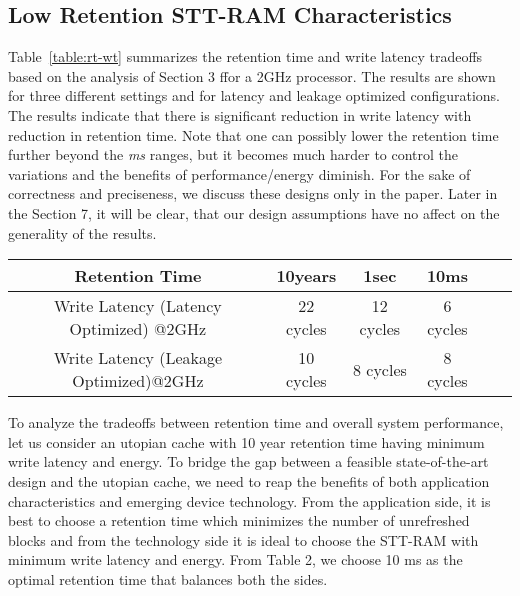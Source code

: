 \subsection{Low Retention STT-RAM Characteristics}
Table~\ref{table:rt-wt} summarizes the retention time and write latency tradeoffs based on the analysis of Section 3
ffor a 2GHz processor.
The results are shown for three different settings and for latency and leakage optimized configurations.
The results indicate that there is significant reduction in write latency with reduction in retention time.
Note that one can possibly lower the retention time further beyond the {\it ms} ranges, but it becomes much harder to control the variations and the benefits of performance/energy diminish. For the sake of correctness and preciseness,
we discuss these designs only in the paper.
Later in the Section 7, it will be clear, that our design assumptions have no affect on the generality of the results.

\begin{table*}[t]
  \centering
  \caption{Retention and Write Latencies for STT-RAM L2 Cache}
  \label{table:rt-wt}
  \begin{tabular}{| c | c | c | c | c | c |}
  	\hline
	 Retention Time & 10years & 1sec &10ms \\
	\hline
	Write Latency (Latency Optimized) @2GHz & 22 cycles & 12 cycles & 6 cycles \\
	\hline
	Write Latency (Leakage Optimized)@2GHz & 10 cycles & 8 cycles & 8 cycles \\
	\hline
  \end{tabular}
\end{table*}

To analyze the tradeoffs between retention time and overall system performance, let us consider an utopian cache
with 10 year retention time having minimum write latency and energy.  To bridge the gap between a
feasible state-of-the-art design and the utopian cache, we need to reap the benefits of both application
characteristics and emerging device technology. From the application side, it is best to choose a retention time
which minimizes the number of unrefreshed blocks and from the technology side it is ideal to choose the
STT-RAM with minimum write latency and energy. From Table 2, we choose 10 ms as the optimal retention time that
balances both the sides.








